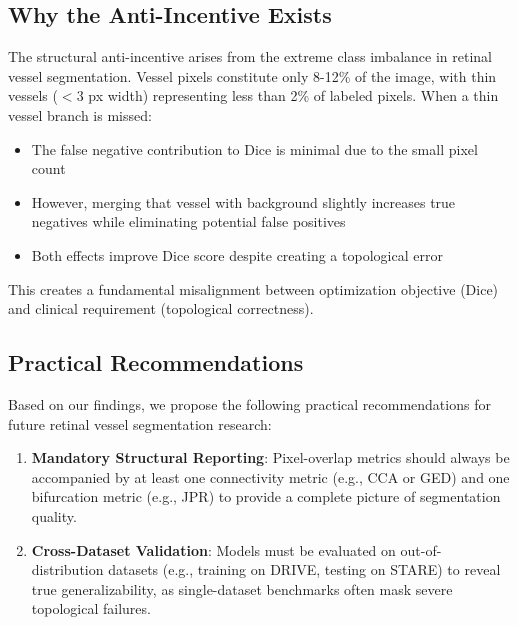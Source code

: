 \documentclass[conference]{IEEEtran}
\begin{document}
\subsection{Why the Anti-Incentive Exists}
The structural anti-incentive arises from the extreme class imbalance in retinal vessel segmentation. Vessel pixels constitute only 8-12\% of the image, with thin vessels ($< 3$ px width) representing less than 2\% of labeled pixels. When a thin vessel branch is missed:
\begin{itemize}
    \item The false negative contribution to Dice is minimal due to the small pixel count
    \item However, merging that vessel with background slightly increases true negatives while eliminating potential false positives
    \item Both effects improve Dice score despite creating a topological error
\end{itemize}
This creates a fundamental misalignment between optimization objective (Dice) and clinical requirement (topological correctness).

\subsection{Practical Recommendations}
Based on our findings, we propose the following practical recommendations for future retinal vessel segmentation research:
\begin{enumerate}
    \item \textbf{Mandatory Structural Reporting}: Pixel-overlap metrics should always be accompanied by at least one connectivity metric (e.g., CCA or GED) and one bifurcation metric (e.g., JPR) to provide a complete picture of segmentation quality.
    \item \textbf{Cross-Dataset Validation}: Models must be evaluated on out-of-distribution datasets (e.g., training on DRIVE, testing on STARE) to reveal true generalizability, as single-dataset benchmarks often mask severe topological failures.
\end{enumerate}
\end{document}
